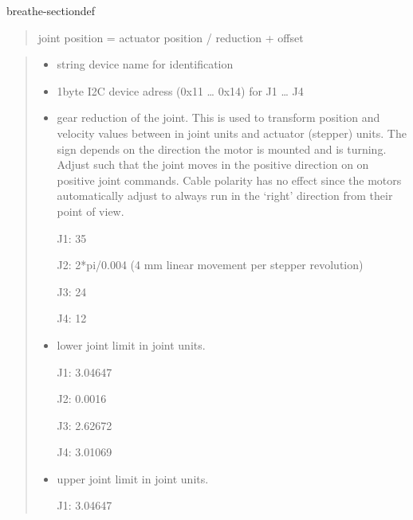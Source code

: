 \documentclass[letterpaper,10pt,english]{sphinxmanual}
\begin{document}
\begin{fulllineitems}
\begin{sphinxuseclass}{breathe-sectiondef}
\begin{fulllineitems}
\begin{quote}
\sphinxAtStartPar
joint position = actuator position / reduction + offset

\end{quote}

\begin{quote}\begin{description}
\begin{itemize}
\item {} 
\sphinxAtStartPar
{} \textendash{} string device name for identification 

\item {} 
\sphinxAtStartPar
{} \textendash{} 1\sphinxhyphen{}byte I2C device adress (0x11 … 0x14) for J1 … J4 

\item {} 
\sphinxAtStartPar
{} \textendash{} 
\sphinxAtStartPar
gear reduction of the joint. This is used to transform position and velocity values between in joint units and actuator (stepper) units. The sign depends on the direction the motor is mounted and is turning. Adjust such that the joint moves in the positive direction on on positive joint commands. Cable polarity has no effect since the motors automatically adjust to always run in the ‘right’ direction from their point of view.

\sphinxAtStartPar
J1: 35

\sphinxAtStartPar
J2: \sphinxhyphen{}2*pi/0.004 (4 mm linear movement per stepper revolution)

\sphinxAtStartPar
J3: 24

J4: 12 

\item {} 
\sphinxAtStartPar
{} \textendash{} 
\sphinxAtStartPar
lower joint limit in joint units.

\sphinxAtStartPar
J1: \sphinxhyphen{}3.04647

\sphinxAtStartPar
J2: \sphinxhyphen{}0.0016

\sphinxAtStartPar
J3: \sphinxhyphen{}2.62672

J4: \sphinxhyphen{}3.01069 

\item {} 
\sphinxAtStartPar
{} \textendash{} 
\sphinxAtStartPar
upper joint limit in joint units.

\sphinxAtStartPar
J1: 3.04647


\end{itemize}
\end{description}
\end{quote}
\end{fulllineitems}
\end{sphinxuseclass}
\end{fulllineitems}
\end{document}
